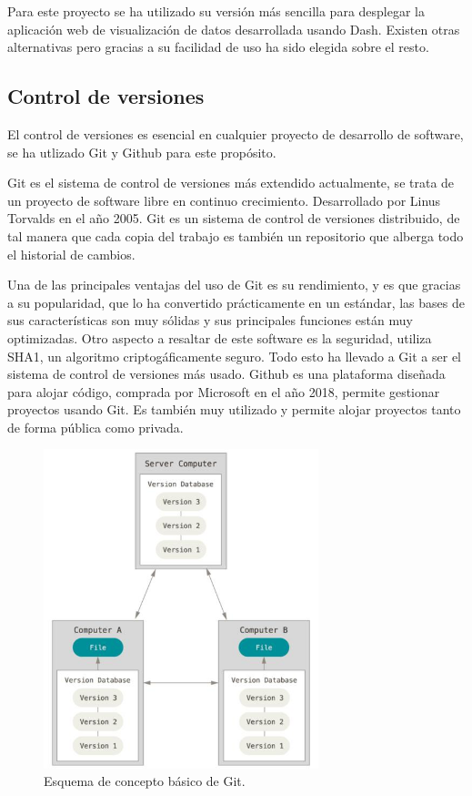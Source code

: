 \documentclass[a4paper, 12pt, oneside]{book}
\begin{document}
Para este proyecto se ha utilizado su versión más sencilla para desplegar la aplicación web de visualización de datos desarrollada usando Dash. Existen otras alternativas pero gracias a su facilidad de uso ha sido elegida sobre el resto.


\subsection{Control de versiones}
\label{subsec:control versiones}

El control de versiones es esencial en cualquier proyecto de desarrollo de software, se ha utlizado Git y Github para este propósito.

Git es el sistema de control de versiones más extendido actualmente, se trata de un proyecto de software libre en continuo crecimiento. Desarrollado por Linus Torvalds en el año 2005. Git es un sistema de control de versiones distribuido, de tal manera que cada copia del trabajo es también un repositorio que alberga todo el historial de cambios.

Una de las principales ventajas del uso de Git es su rendimiento, y es que gracias a su popularidad, que lo ha convertido prácticamente en un estándar, las bases de sus características son muy sólidas y sus principales funciones están muy optimizadas. Otro aspecto a resaltar de este software es la seguridad, utiliza SHA1, un algoritmo criptogáficamente seguro. Todo esto ha llevado a Git a ser el sistema de control de versiones más usado.
Github es una plataforma diseñada para alojar código, comprada por Microsoft en el año 2018, permite gestionar proyectos usando Git. Es también muy utilizado y permite alojar proyectos tanto de forma pública como privada.

\begin{figure}[H]
	\centering
    \includegraphics[width=8cm, keepaspectratio]{img/git}
    \caption{Esquema de concepto básico de Git.}
    \label{figura:esquema_git}
\end{figure}
\end{document}
